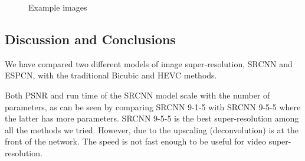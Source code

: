 \documentclass[12pt,journal,compsoc]{IEEEtran}
\begin{document}
\begin{figure}[!t]
{	\label{fig_second_case}
}
\hfil 
{}
\hfil 
{}
\hfil 
{}
\caption{Example images} 
\label{fig_example} 
\end{figure}

\subsection{Discussion and Conclusions}
We have compared two different models of image super-resolution, SRCNN and ESPCN, with the traditional Bicubic and HEVC methods.

Both PSNR and run time of the SRCNN model scale with the number of parameters, as can be seen by comparing SRCNN 9-1-5 with SRCNN 9-5-5 where the latter has more parameters. SRCNN 9-5-5 is the best super-resolution among all the methods we tried. However, due to the upscaling (deconvolution) is at the front of the network. The speed is not fast enough to be useful for video super-resolution.
\end{document}
